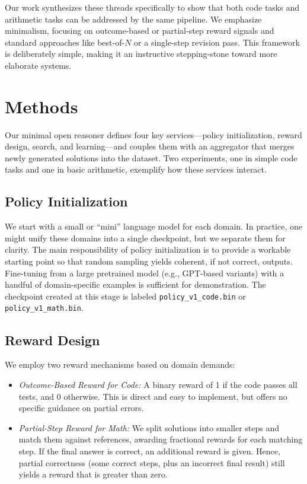 \documentclass{article}
\begin{document}
Our work synthesizes these threads specifically to show that both code tasks and arithmetic tasks can be addressed by the same pipeline. We emphasize minimalism, focusing on outcome-based or partial-step reward signals and standard approaches like best-of-\(N\) or a single-step revision pass. This framework is deliberately simple, making it an instructive stepping-stone toward more elaborate systems.

\section{Methods}
Our minimal open reasoner defines four key services—policy initialization, reward design, search, and learning—and couples them with an aggregator that merges newly generated solutions into the dataset. Two experiments, one in simple code tasks and one in basic arithmetic, exemplify how these services interact.

\subsection{Policy Initialization}
We start with a small or “mini” language model for each domain. In practice, one might unify these domains into a single checkpoint, but we separate them for clarity. The main responsibility of policy initialization is to provide a workable starting point so that random sampling yields coherent, if not correct, outputs. Fine-tuning from a large pretrained model (e.g., GPT-based variants) with a handful of domain-specific examples is sufficient for demonstration. The checkpoint created at this stage is labeled \texttt{policy\_v1\_code.bin} or \texttt{policy\_v1\_math.bin}.

\subsection{Reward Design}
We employ two reward mechanisms based on domain demands:
\begin{itemize}
\item \textit{Outcome-Based Reward for Code:} A binary reward of 1 if the code passes all tests, and 0 otherwise. This is direct and easy to implement, but offers no specific guidance on partial errors.
\item \textit{Partial-Step Reward for Math:} We split solutions into smaller steps and match them against references, awarding fractional rewards for each matching step. If the final answer is correct, an additional reward is given. Hence, partial correctness (some correct steps, plus an incorrect final result) still yields a reward that is greater than zero.
\end{itemize}
\end{document}
